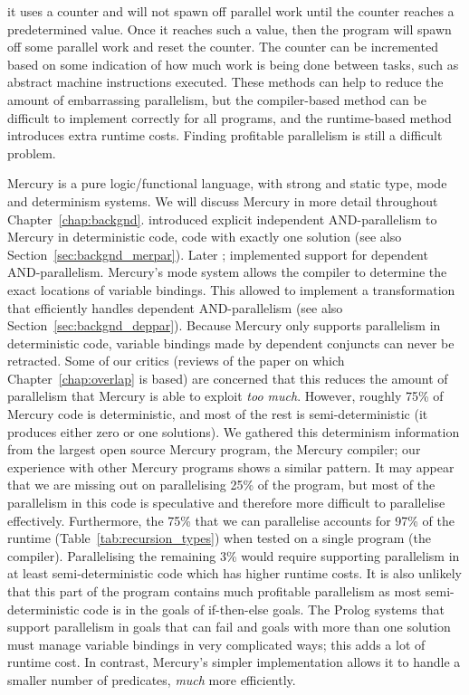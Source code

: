 it uses a counter and will not spawn off parallel work until the counter
reaches a predetermined value.
Once it reaches such a value, then the program will spawn off some parallel
work and reset the counter.
The counter can be incremented based on some indication of how much work is
being done between tasks, such as abstract machine instructions executed.
These methods can help to reduce the amount of embarrassing parallelism,
but the compiler-based method can be difficult to implement correctly for
all programs,
and the runtime-based method introduces extra runtime costs.
Finding profitable parallelism is still a difficult problem.

Mercury is a pure logic/functional language, with strong and static type,
mode and determinism systems.
We will discuss Mercury in more detail throughout
Chapter~\ref{chap:backgnd}.
\citet{conway:2002:par} introduced explicit independent AND-parallelism
to Mercury in deterministic code,
code with exactly one solution
(see also Section~\ref{sec:backgnd_merpar}). 
Later \citet{wang:2006:hons}; \citet{wang:2011:dep-par} 
implemented support for dependent AND-parallelism.
Mercury's mode system allows the compiler to determine the exact locations
of variable bindings.
This allowed \citeauthor{wang:2006:hons} to implement a transformation that
efficiently handles dependent AND-parallelism
(see also Section~\ref{sec:backgnd_deppar}). 
Because Mercury only supports parallelism in deterministic code,
variable bindings made by dependent conjuncts can never be retracted.
Some of our critics (reviews of the paper \citet{bone:2011:overlap}
on which Chapter~\ref{chap:overlap} is based)
are concerned that this reduces the amount of parallelism that Mercury is
able to exploit \emph{too much}.
However,
roughly 75\% of Mercury code is deterministic,
and most of the rest is semi-deterministic
(it produces either zero or one solutions).
We gathered this determinism information from the
largest open source Mercury program, the Mercury compiler;
our experience with other Mercury programs shows a similar pattern.
It may appear that we are missing out on parallelising 25\% of the
program,
but most of the parallelism in this code is speculative and therefore
more difficult to parallelise effectively.
Furthermore,
the 75\% that we can parallelise accounts for 97\% of the runtime
(Table~\ref{tab:recursion_types})
when tested on a single program (the compiler).
Parallelising the remaining 3\% would require
supporting parallelism in at least semi-deterministic code which has higher
runtime costs.
It is also unlikely that this part of the program contains much profitable
parallelism as most semi-deterministic code is in the goals of if-then-else
goals.
The Prolog systems that support parallelism in goals that can fail and
goals with more than one solution must manage variable bindings
in very complicated ways;
this adds a lot of runtime cost.
In contrast, Mercury's simpler implementation allows it to handle a
smaller number of predicates, \emph{much} more efficiently.

